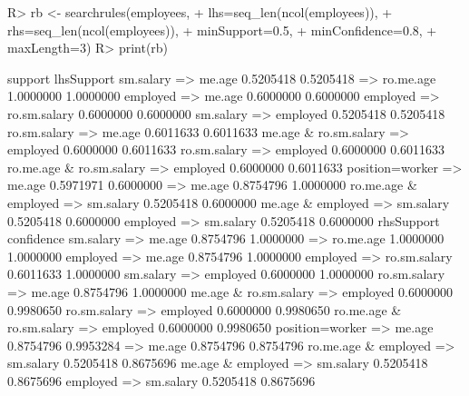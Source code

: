 \begin{Schunk}
% --begin: "searchrules"
\begin{Sinput}
R> rb <- searchrules(employees,
+                    lhs=seq_len(ncol(employees)),
+                    rhs=seq_len(ncol(employees)),
+                    minSupport=0.5,
+                    minConfidence=0.8,
+                    maxLength=3)
R> print(rb)
\end{Sinput}
\begin{Soutput}
                                       support lhsSupport
sm.salary => me.age                  0.5205418  0.5205418
 => ro.me.age                        1.0000000  1.0000000
employed => me.age                   0.6000000  0.6000000
employed => ro.sm.salary             0.6000000  0.6000000
sm.salary => employed                0.5205418  0.5205418
ro.sm.salary => me.age               0.6011633  0.6011633
me.age & ro.sm.salary => employed    0.6000000  0.6011633
ro.sm.salary => employed             0.6000000  0.6011633
ro.me.age & ro.sm.salary => employed 0.6000000  0.6011633
position=worker => me.age            0.5971971  0.6000000
 => me.age                           0.8754796  1.0000000
ro.me.age & employed => sm.salary    0.5205418  0.6000000
me.age & employed => sm.salary       0.5205418  0.6000000
employed => sm.salary                0.5205418  0.6000000
                                     rhsSupport confidence
sm.salary => me.age                   0.8754796  1.0000000
 => ro.me.age                         1.0000000  1.0000000
employed => me.age                    0.8754796  1.0000000
employed => ro.sm.salary              0.6011633  1.0000000
sm.salary => employed                 0.6000000  1.0000000
ro.sm.salary => me.age                0.8754796  1.0000000
me.age & ro.sm.salary => employed     0.6000000  0.9980650
ro.sm.salary => employed              0.6000000  0.9980650
ro.me.age & ro.sm.salary => employed  0.6000000  0.9980650
position=worker => me.age             0.8754796  0.9953284
 => me.age                            0.8754796  0.8754796
ro.me.age & employed => sm.salary     0.5205418  0.8675696
me.age & employed => sm.salary        0.5205418  0.8675696
employed => sm.salary                 0.5205418  0.8675696
\end{Soutput}
%
% --end: "searchrules"
\end{Schunk}
